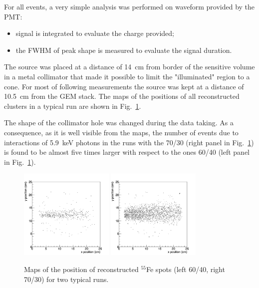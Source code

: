 \documentclass[a4paper,11pt]{article}
\begin{document}
For all events, a very simple analysis was performed on waveform provided by the PMT:
\begin{itemize}
    \item signal is integrated to evaluate the charge provided; 
    \item the FWHM of peak shape is measured to evaluate the signal duration.
\end{itemize}

The source was placed at a distance of 14~cm from border of the sensitive volume in a metal collimator that made it possible to limit the "illuminated" region to a cone. 
For most of following measurements the source was kept at a distance of 10.5~cm from the GEM stack. 
The maps of the positions of all reconstructed clusters in a typical run are shown in Fig.~\ref{fig:map}. 

The shape of the collimator hole was changed during the data taking. 
As a consequence, as it is well visible from the maps, the number of events due to interactions of 5.9~keV photons in the runs with the 70/30 (right panel in Fig.~\ref{fig:map}) is found to be almost five times larger with respect to the ones 60/40 (left panel in Fig.~\ref{fig:map}).

\begin{figure}[ht]
\centering
\includegraphics[width=0.4\textwidth]{Figures/map_6040.png}
\includegraphics[width=0.4\textwidth]{Figures/map_7030.png}
\caption{Maps of the position of reconstructed $^{55}$Fe spots (left 60/40, right 70/30) for two typical runs.} 
\label{fig:map}
\end{figure}
\end{document}
